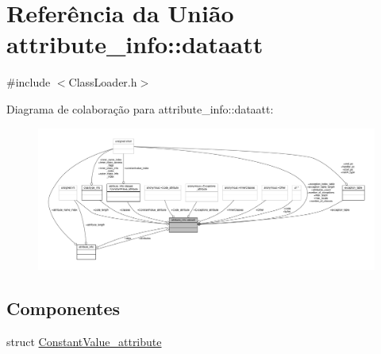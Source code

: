 \hypertarget{unionattribute__info_1_1dataatt}{}\section{Referência da União attribute\+\_\+info\+:\+:dataatt}
\label{unionattribute__info_1_1dataatt}


{\ttfamily \#include $<$Class\+Loader.\+h$>$}



Diagrama de colaboração para attribute\+\_\+info\+:\+:dataatt\+:\nopagebreak
\begin{figure}[H]
\begin{center}
\leavevmode
\includegraphics[width=350pt]{unionattribute__info_1_1dataatt__coll__graph}
\end{center}
\end{figure}
\subsection*{Componentes}
\begin{DoxyCompactItemize}
\item 
struct \hyperlink{structattribute__info_1_1dataatt_1_1ConstantValue__attribute}{Constant\+Value\+\_\+attribute}
\end{DoxyCompactItemize}
